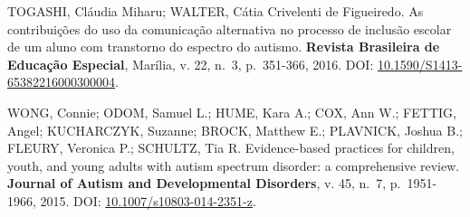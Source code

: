TOGASHI, Cláudia Miharu; WALTER, Cátia Crivelenti de Figueiredo. As
contribuições do uso da comunicação alternativa no processo de inclusão
escolar de um aluno com transtorno do espectro do autismo.
\textbf{Revista Brasileira de Educação Especial}, Marília, v. 22, n.~3,
p.~351-366, 2016. DOI: \url{10.1590/S1413-65382216000300004}.

WONG, Connie; ODOM, Samuel L.; HUME, Kara A.; COX, Ann W.; FETTIG,
Angel; KUCHARCZYK, Suzanne; BROCK, Matthew E.; PLAVNICK, Joshua B.;
FLEURY, Veronica P.; SCHULTZ, Tia R. Evidence-based practices for
children, youth, and young adults with autism spectrum disorder: a
comprehensive review. \textbf{Journal of Autism and Developmental
Disorders}, v. 45, n.~7, p.~1951-1966, 2015. DOI:
\url{10.1007/s10803-014-2351-z}.

\endgroup
